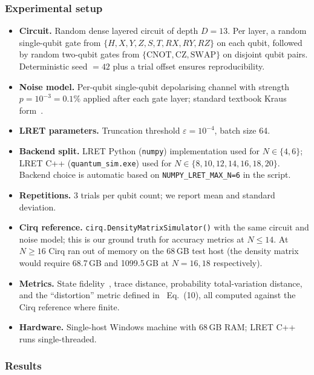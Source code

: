 \documentclass[11pt,a4paper]{article}
\begin{document}
\subsubsection*{Experimental setup}

\begin{itemize}
  \item \textbf{Circuit.} Random dense layered circuit of depth $D = 13$. Per layer,
        a random single-qubit gate from $\{H, X, Y, Z, S, T, RX, RY, RZ\}$ on each
        qubit, followed by random two-qubit gates from $\{\text{CNOT}, \text{CZ},
        \text{SWAP}\}$ on disjoint qubit pairs. Deterministic seed $=42$ plus a
        trial offset ensures reproducibility.
  \item \textbf{Noise model.} Per-qubit single-qubit depolarising channel
        with strength $p = 10^{-3} = 0.1\%$ applied after each gate layer;
        standard textbook Kraus form~\cite{nielsenchuang2010}.
  \item \textbf{LRET parameters.} Truncation threshold $\varepsilon = 10^{-4}$,
        batch size 64.
  \item \textbf{Backend split.} LRET Python (\texttt{numpy}) implementation used for
        $N \in \{4,6\}$; LRET C++ (\texttt{quantum\_sim.exe}) used for
        $N \in \{8,10,12,14,16,18,20\}$. Backend choice is automatic based on
        \texttt{NUMPY\_LRET\_MAX\_N=6} in the script.
  \item \textbf{Repetitions.} 3 trials per qubit count; we report mean and standard
        deviation.
  \item \textbf{Cirq reference.} \texttt{cirq.DensityMatrixSimulator()} with the same
        circuit and noise model; this is our ground truth for accuracy metrics at
        $N \le 14$. At $N \ge 16$ Cirq ran out of memory on the 68\,GB test host
        (the density matrix would require 68.7\,GB and 1099.5\,GB at $N=16,18$
        respectively).
  \item \textbf{Metrics.} State fidelity~\cite{nielsenchuang2010}, trace distance,
        probability total-variation distance, and the ``distortion'' metric defined
        in~\cite{chen2021lret} Eq.\ (10), all computed against the Cirq reference
        where finite.
  \item \textbf{Hardware.} Single-host Windows machine with 68\,GB RAM; LRET C++
        runs single-threaded.
\end{itemize}

\subsubsection*{Results}
\end{document}
